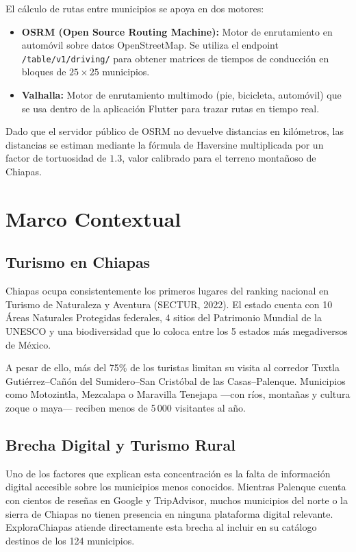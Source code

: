 \documentclass[12pt,letterpaper]{report}
\begin{document}
El cálculo de rutas entre municipios se apoya en dos motores:

\begin{itemize}
  \item \textbf{OSRM (Open Source Routing Machine):} Motor de enrutamiento en automóvil
        sobre datos OpenStreetMap. Se utiliza el endpoint \texttt{/table/v1/driving/} para
        obtener matrices de tiempos de conducción en bloques de $25 \times 25$ municipios.
  \item \textbf{Valhalla:} Motor de enrutamiento multimodo (pie, bicicleta, automóvil) que
        se usa dentro de la aplicación Flutter para trazar rutas en tiempo real.
\end{itemize}

Dado que el servidor público de OSRM no devuelve distancias en kilómetros, las distancias
se estiman mediante la fórmula de Haversine multiplicada por un factor de tortuosidad de
$1.3$, valor calibrado para el terreno montañoso de Chiapas.

\section{Marco Contextual}

\subsection{Turismo en Chiapas}

Chiapas ocupa consistentemente los primeros lugares del ranking nacional en Turismo de
Naturaleza y Aventura (SECTUR, 2022). El estado cuenta con 10 Áreas Naturales Protegidas
federales, 4 sitios del Patrimonio Mundial de la UNESCO y una biodiversidad que lo coloca
entre los 5 estados más megadiversos de México.

A pesar de ello, más del 75\% de los turistas limitan su visita al corredor Tuxtla
Gutiérrez–Cañón del Sumidero–San Cristóbal de las Casas–Palenque. Municipios como Motozintla,
Mezcalapa o Maravilla Tenejapa —con ríos, montañas y cultura zoque o maya— reciben menos de
5\,000 visitantes al año.

\subsection{Brecha Digital y Turismo Rural}

Uno de los factores que explican esta concentración es la falta de información digital accesible
sobre los municipios menos conocidos. Mientras Palenque cuenta con cientos de reseñas en Google
y TripAdvisor, muchos municipios del norte o la sierra de Chiapas no tienen presencia en ninguna
plataforma digital relevante. ExploraChiapas atiende directamente esta brecha al incluir en su
catálogo destinos de los 124 municipios.
\end{document}
